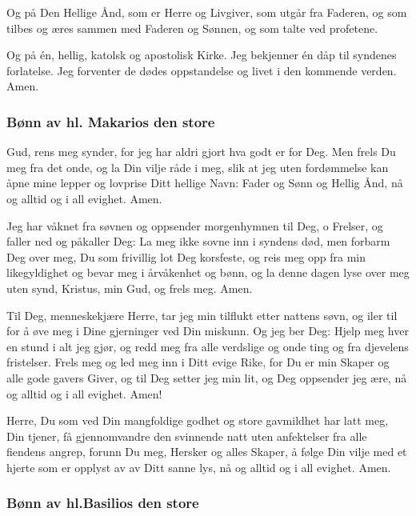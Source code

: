 Og på Den Hellige Ånd, som er Herre og Livgiver, som utgår fra Faderen, og som tilbes og æres sammen med Faderen og Sønnen, og som talte ved profetene. 

Og på én, hellig, katolsk og apostolisk Kirke. Jeg bekjenner én dåp til syndenes forlatelse. Jeg forventer de dødes oppstandelse og livet i den kommende verden. Amen. 

\subsubsection{Bønn av hl. Makarios den store }

Gud, rens meg synder, for jeg har aldri gjort hva godt er for Deg. Men frels Du meg fra det onde, og la Din vilje råde i meg, slik at jeg uten fordømmelse kan åpne mine lepper og lovprise Ditt hellige Navn: Fader og Sønn og Hellig Ånd, nå og alltid og i all evighet. Amen.

Jeg har våknet fra søvnen og oppsender morgenhymnen til Deg, o Frelser, og faller ned og påkaller Deg: La meg ikke sovne inn i syndens død, men forbarm Deg over meg, Du som frivillig lot Deg korsfeste, og reis meg opp fra min likegyldighet og bevar meg i årvåkenhet og bønn, og la denne dagen lyse over meg uten synd, Kristus, min Gud, og frels meg. Amen. 

Til Deg, menneskekjære Herre, tar jeg min tilflukt etter nattens søvn, og iler til for å øve meg i Dine gjerninger ved Din miskunn. Og jeg ber Deg: Hjelp meg hver en stund i alt jeg gjør, og redd meg fra alle verdslige og onde ting og fra djevelens fristelser. Frels meg og led meg inn i Ditt evige Rike, for Du er min Skaper og alle gode gavers Giver, og til Deg setter jeg min lit, og Deg oppsender jeg ære, nå og alltid og i all evighet. Amen! 

Herre, Du som ved Din mangfoldige godhet og store gavmildhet har latt meg, Din tjener, få gjennomvandre den svinnende natt uten anfektelser fra alle fiendens angrep, forunn Du meg, Hersker og alles Skaper, å følge Din vilje med et hjerte som er opplyst av av Ditt sanne lys, nå og alltid og i all evighet. Amen. 

\subsubsection{Bønn av hl.Basilios den store }

